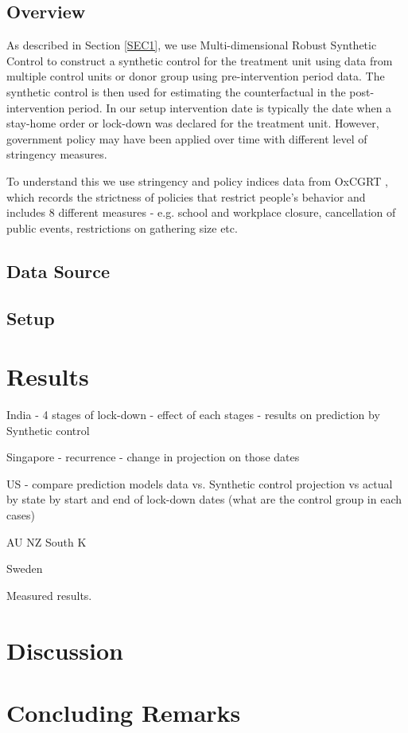\documentclass[preprint,authoryear,12pt]{elsarticle}
\begin{document}
\subsection{Overview}
As described in Section \ref{SEC1}, we use Multi-dimensional Robust Synthetic Control to construct a synthetic control for the treatment unit using data from multiple control units or donor group using pre-intervention period data.  The synthetic control is then used for estimating the counterfactual in the post-intervention period. In our setup intervention date is typically the date when a stay-home order or lock-down was declared for the treatment unit.  However, government policy may have been applied over time with different level of stringency measures. 

To understand this we use stringency and policy indices data from OxCGRT \cite{HWP2020}, which records the strictness of policies that restrict people’s behavior and includes 8 different measures - e.g. school  and workplace closure, cancellation of public events, restrictions on gathering size etc. 

\subsection{Data Source}

\subsection{Setup}


\section{Results}
\label{SEC3}
	
	India - 4 stages of lock-down - effect of each stages - results on prediction by Synthetic control


	Singapore - recurrence - change in projection on those dates
	
	US - compare prediction models data vs. Synthetic control projection vs actual by state by start and end of lock-down dates (what are the control group in each cases)
	
	AU NZ South K
	
	Sweden
	
	Measured results. 
	
	\section{Discussion}
	\label{SEC4}
	
	
	\section{Concluding Remarks}
	\label{SEC5}
	
	
		
\end{document}
